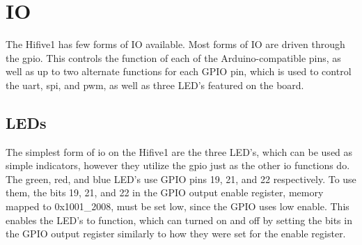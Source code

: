 \section{IO}
The Hifive1 has few forms of IO available. Most forms of IO are driven through the \ac{gpio}. This controls the function of each of the Arduino-compatible pins, as well as up to two alternate functions for each GPIO pin, which is used to control the \ac{uart}, \ac{spi}, and \ac{pwm}, as well as three LED's featured on the board. 
\subsection{LEDs}
The simplest form of \ac{io} on the Hifive1 are the three LED's, which can be used as simple indicators, however they utilize the \ac{gpio} just as the other \ac{io} functions do. The green, red, and blue LED's use GPIO pins 19, 21, and 22 respectively. To use them, the bits 19, 21, and 22 in the GPIO output enable register, memory mapped to 0x1001\_2008, must be set low, since the GPIO uses low enable. This enables the LED's to function, which can turned on and off by setting the bits in the GPIO output register similarly to how they were set for the enable register.

